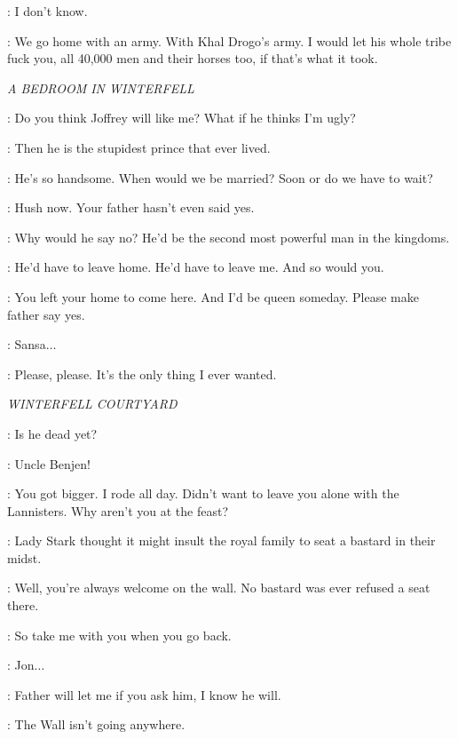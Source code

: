 \DAENERYS: I don't know. 

\VISERYS: We go home with an army. With Khal Drogo's army. I would let his whole tribe fuck you, all 40,000 men and their horses too, if that's what it took. 


\scene

\textit{A BEDROOM IN WINTERFELL} 


\SANSA: Do you think Joffrey will like me? What if he thinks I'm ugly? 

\CATELYN: Then he is the stupidest prince that ever lived. 

\SANSA: He's so handsome. When would we be married? Soon or do we have to wait? 

\CATELYN: Hush now. Your father hasn't even said yes. 

\SANSA: Why would he say no? He'd be the second most powerful man in the kingdoms. 

\CATELYN: He'd have to leave home. He'd have to leave me. And so would you. 

\SANSA: You left your home to come here. And I'd be queen someday. Please make father say yes. 

\CATELYN: Sansa$\ldots$ 

\SANSA: Please, please. It's the only thing I ever wanted. 


\scene

\textit{WINTERFELL COURTYARD} 


\BENJEN: Is he dead yet? 

\JON: Uncle Benjen! 


\BENJEN: You got bigger. I rode all day. Didn't want to leave you alone with the Lannisters. Why aren't you at the feast? 

\JON: Lady Stark thought it might insult the royal family to seat a bastard in their midst. 

\BENJEN: Well, you're always welcome on the wall. No bastard was ever refused a seat there. 

\JON: So take me with you when you go back. 

\BENJEN: Jon$\ldots$ 

\JON: Father will let me if you ask him, I know he will. 

\BENJEN: The Wall isn't going anywhere. 


